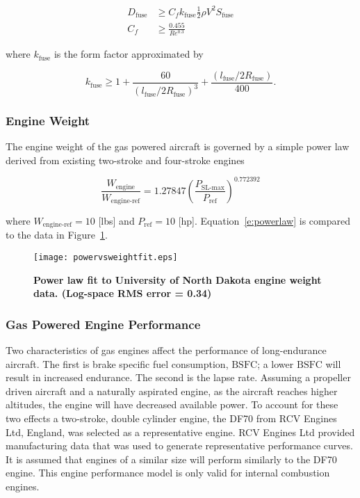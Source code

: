 \begin{align}
    \label{e:fusedrag}
    D_{\text{fuse}} &\geq C_f k_{\text{fuse}} \frac{1}{2} \rho V^2 S_{\text{fuse}} \\
    C_f &\geq \frac{0.455}{Re^{0.3}}
\end{align}

where $k_{\text{fuse}}$ is the form factor approximated by\cite{raymer}

\begin{equation}
    \label{e:fuseform}
    k_{\text{fuse}} \geq 1 + \frac{60}{(l_{\text{fuse}}/2R_{\text{fuse}})^3} + \frac{(l_{\text{fuse}}/2R_{\text{fuse}})}{400}.
\end{equation}

\subsubsection{Engine Weight}

The engine weight of the gas powered aircraft is governed by a simple power law derived from existing two-stroke and four-stroke engines\cite{gasengine}

\begin{equation}
    \label{e:powerlaw}
    \frac{W_{\text{engine}}}{W_{\text{engine-ref}}} = 1.27847 \left(\frac{P_{\text{SL-max}}}{P_{\text{ref}}} \right)^{0.772392}
\end{equation}

where $W_{\text{engine-ref}} = 10$ [lbs] and $P_{\text{ref}} = 10$ [hp].   
Equation~\eqref{e:powerlaw} is compared to the data in Figure~\ref{f:powervsweightfit}.

\begin{figure}[h!]
	\begin{center}
	\texttt{[image: powervsweightfit.eps]}
    \caption{\textbf{Power law fit to University of North Dakota engine weight data\cite{gasengine}. (Log-space RMS error = 0.34)}}
	\label{f:powervsweightfit}
	\end{center}
\end{figure}

\subsubsection{Gas Powered Engine Performance}

Two characteristics of gas engines affect the performance of long-endurance aircraft.  
The first is brake specific fuel consumption, $\text{BSFC}$; a lower $\text{BSFC}$ will result in increased endurance.  
The second is the lapse rate.  
Assuming a propeller driven aircraft and a naturally aspirated engine, as the aircraft reaches higher altitudes, the engine will have decreased available power. 
To account for these two effects a two-stroke, double cylinder engine, the DF70 from RCV Engines Ltd, England, was selected as a representative engine.  
RCV Engines Ltd provided manufacturing data that was used to generate representative performance curves.\cite{rcvengines}
It is assumed that engines of a similar size will perform similarly to the DF70 engine.  
This engine performance model is only valid for internal combustion engines.

